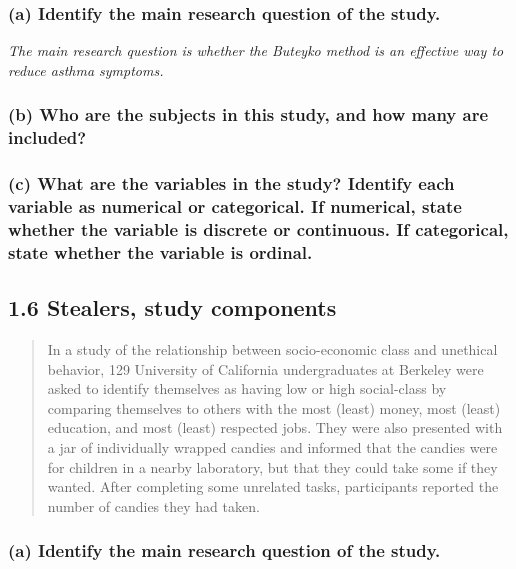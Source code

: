 \documentclass[
]{article}
\begin{document}
\subsubsection{(a) Identify the main research question of the
study.}\label{a-identify-the-main-research-question-of-the-study.}

\emph{The main research question is whether the Buteyko method is an
effective way to reduce asthma symptoms.}

\subsubsection{(b) Who are the subjects in this study, and how many are
included?}\label{b-who-are-the-subjects-in-this-study-and-how-many-are-included}

\subsubsection{(c) What are the variables in the study? Identify each
variable as numerical or categorical. If numerical, state whether the
variable is discrete or continuous. If categorical, state whether the
variable is
ordinal.}\label{c-what-are-the-variables-in-the-study-identify-each-variable-as-numerical-or-categorical.-if-numerical-state-whether-the-variable-is-discrete-or-continuous.-if-categorical-state-whether-the-variable-is-ordinal.}

\subsection{1.6 Stealers, study
components}\label{stealers-study-components}

\begin{quote}
In a study of the relationship between socio-economic class and
unethical behavior, 129 University of California undergraduates at
Berkeley were asked to identify themselves as having low or high
social-class by comparing themselves to others with the most (least)
money, most (least) education, and most (least) respected jobs. They
were also presented with a jar of individually wrapped candies and
informed that the candies were for children in a nearby laboratory, but
that they could take some if they wanted. After completing some
unrelated tasks, participants reported the number of candies they had
taken.
\end{quote}

\subsubsection{(a) Identify the main research question of the
study.}\label{a-identify-the-main-research-question-of-the-study.-1}
\end{document}
